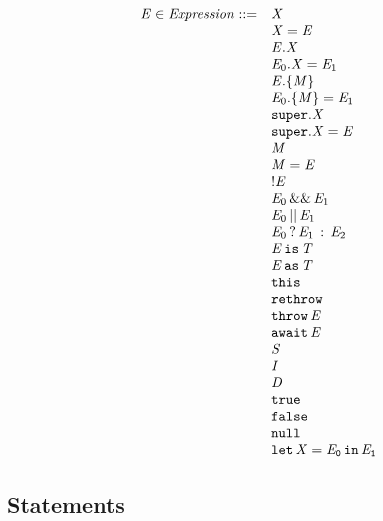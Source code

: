 \documentclass[a4paper,oneside]{article}
\begin{document}
\[
\begin{array}{rl}
  \mathit{E} \in \mathit{Expression} ::=
  & \mathit{X} \\
  & \mathit{X}=\mathit{E} \\
  & \mathit{E}.\mathit{X} \\
  & \mathit{E}_0.\mathit{X}=\mathit{E}_1 \\
  & \mathit{E}.\{\mathit{M}\} \\
  & \mathit{E}_0.\{\mathit{M}\}=\mathit{E}_1 \\
  & \tt{super}.\mathit{X} \\
  & \tt{super}.\mathit{X}=\mathit{E} \\
  & \mathit{M} \\
  & \mathit{M}=\mathit{E} \\
  & !\mathit{E} \\
  & \mathit{E}_0\,\&\&\,\mathit{E}_1 \\
  & \mathit{E}_0\,||\,\mathit{E}_1 \\
  & \mathit{E}_0\,?\,\mathit{E}_1\,:\,\mathit{E}_2 \\
  & \mathit{E}\,\tt{is}\,\mathit{T} \\
  & \mathit{E}\,\tt{as}\,\mathit{T} \\
  & \tt{this} \\
  & \tt{rethrow} \\
  & \tt{throw}\,\mathit{E} \\
  & \tt{await\,\ensuremath{\mathit{E}}} \\
  & \mathit{S} \\
  & \mathit{I} \\
  & \mathit{D} \\
  & \tt{true} \\
  & \tt{false} \\
  & \tt{null} \\
  & \tt{let}\,\mathit{X}=\mathit{E}_0\,\tt{in}\,\mathit{E}_1 \\
\end{array}
\]


\subsection{Statements}
\label{subsec:stmt-syntax}
\end{document}
